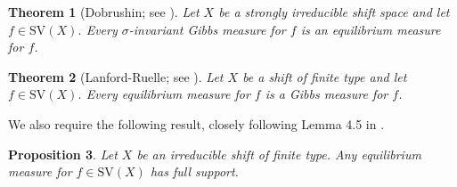 \documentclass{amsproc}
\newtheorem{theorem}{Theorem}
\numberwithin{theorem}{section}
\newtheorem{proposition}[theorem]{Proposition}
\theoremstyle{remark}
\theoremstyle{definition}
\newcommand{\SV}{\mathrm{SV}}
\theoremstyle{plain}
\begin{document}
\begin{theorem}[Dobrushin; see \cite{ruelle-2004-thermo}]\label{dobrushin}
Let $X$ be a strongly irreducible shift space and let $f \in \SV(X)$. Every $\sigma$-invariant Gibbs measure for $f$ is an equilibrium measure for $f$.
\end{theorem}

\begin{theorem}[Lanford-Ruelle; see \cite{meyerovitch2013gibbs}]\label{lf}
Let $X$ be a shift of finite type and let $f \in \SV(X)$. Every equilibrium measure for $f$ is a Gibbs measure for $f$.
\end{theorem}


We also require the following result, closely following Lemma 4.5 in \cite{yoo2018decomposition}.


\begin{proposition}\label{yoo-sv}
Let $X$ be an irreducible shift of finite type. Any equilibrium measure for $f \in \SV(X)$ has full support.
\end{proposition}
\end{document}
